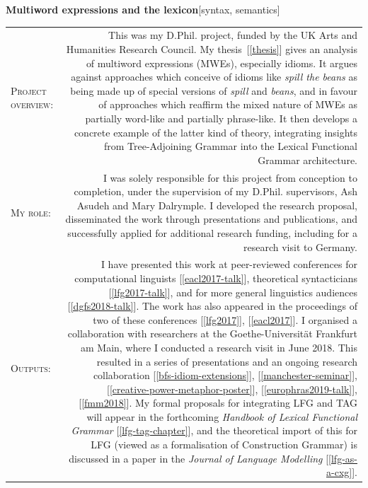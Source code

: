 \documentclass[11pt,a4paper]{article}
\makeatletter
\newlength{\rulelength}%
\newcommand{\REx}[2]{%
\vspace*{0.1\baselineskip}%
{\large\textbf{#1}\hfill\textnormal{[#2]}}%
\vspace*{0.5\baselineskip}%
}
\newenvironment{cvsection}{%
  \setlength{\extrarowheight}{0.70ex}
  \begin{longtable}[l]{@{} L R @{}}
}{%
  \end{longtable}
}
\newcommand{\sref}[1]{[\ref{#1}]}
\newcommand{\researchsubhead}[1]{%
\textsc{#1}:%
}
\newcommand{\cvheading}[1]{\noindent{{\color{headercolor}\rule[0.4ex]{\rulelength}{2pt}\hspace*{9pt} \Large #1}}\vspace*{0.5\baselineskip}}
\makeatother
\begin{document}
\REx{Multiword expressions and the lexicon}{syntax, semantics}
\begin{cvsection}
  \researchsubhead{Project overview} &%
  This was my D.Phil. project, funded by the UK Arts and Humanities Research
  Council. My thesis~\sref{thesis} gives an analysis of multiword expressions
  (MWEs), especially idioms. It argues against approaches which conceive of
  idioms like \emph{spill the beans} as being made up of special versions of
  \emph{spill} and \emph{beans}, and in favour of approaches which reaffirm the
  mixed nature of MWEs as partially word-like and partially phrase-like. It then
  develops a concrete example of the latter kind of theory, integrating insights
  from Tree-Adjoining Grammar into the Lexical Functional Grammar architecture.%
  \\
  \researchsubhead{My role} &%
  I was solely responsible for this project from conception to completion, under
  the supervision of my D.Phil. supervisors, Ash Asudeh and Mary Dalrymple. I
  developed the research proposal, disseminated the work through presentations
  and publications, and successfully applied for additional research funding,
  including for a research visit to Germany.
  \\
  \researchsubhead{Outputs} &%
  I have presented this work at peer-reviewed conferences for computational
  linguists \sref{eacl2017-talk}, theoretical syntacticians \sref{lfg2017-talk},
  and for more general linguistics audiences \sref{dgfs2018-talk}. The work has
  also appeared in the proceedings of two of these conferences \sref{lfg2017},
  \sref{eacl2017}. I organised a collaboration with researchers at the
  Goethe-Universit\"{a}t Frankfurt am Main, where I conducted a research visit
  in June 2018. This resulted in a series of presentations and an ongoing
  research collaboration \sref{bfs-idiom-extensions}, \sref{manchester-seminar},
  \sref{creative-power-metaphor-poster}, \sref{europhras2019-talk},
  \sref{fmm2018}. My formal proposals for integrating LFG and TAG will appear in
  the forthcoming \textit{Handbook of Lexical Functional Grammar}
  \sref{lfg-tag-chapter}, and the theoretical import of this for LFG (viewed as
  a formalisation of Construction Grammar) is discussed in a paper in
  the \textit{Journal of Language Modelling} \sref{lfg-as-a-cxg}.
\end{cvsection}

\newpage

\cvheading{Teaching}
\end{document}
